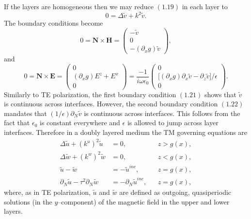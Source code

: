 If the layers are homogeneous then we may reduce $(1.19)$ in each layer to 
\begin{equation}
0=\Delta \tilde{v} + k^2\tilde{v}.
\end{equation}
The boundary conditions become
\begin{equation}
0=\textbf{N} \times \textbf{H} = \begin{pmatrix}
-\tilde{v} \\ 0 \\ -(\partial_x g)\tilde{v}
\end{pmatrix},
\end{equation}
and
\begin{equation}
0=\textbf{N} \times \textbf{E} = \begin{pmatrix}
0 \\ (\partial_x g)E^z + E^x \\ 0 
\end{pmatrix}=\frac{-1}{i\omega\epsilon_0}\begin{pmatrix}
0 \\ \big[(\partial_x g)\partial_x \tilde{v} - \partial_z \tilde{v}\big]/\epsilon \\ 0
\end{pmatrix}.
\end{equation}
Similarly to TE polarization, the first boundary condition $(1.21)$ shows that $\tilde{v}$ is continuous across interfaces. However, the second boundary condition $(1.22)$ mandates that $(1/\epsilon)\partial_N \tilde{v}$ is continuous across interfaces. This follows from the fact that $\epsilon_0$ is constant everywhere and $\epsilon$ is allowed to jump across layer interfaces. Therefore in a doubly layered medium the TM governing equations are
\begin{subequations}
\begin{align}
\Delta \tilde{u} + (k^u)^2 \tilde{u} &=0,&& z > g(x),\\
\Delta \tilde{w} + (k^w)^2 \tilde{w} &=0,&& z < g(x),\\
\tilde{u}-\tilde{w} &= -\tilde{u}^{inc},&& z=g(x),\\
\partial_N \tilde{u}-\tau^2\partial_N \tilde{w} &= -\partial_N \tilde{u}^{inc},&& z=g(x),
\end{align}
\end{subequations}
where, as in TE polarization, $\tilde{u}$ and $\tilde{w}$ are defined as outgoing, quasiperiodic solutions (in the $y$--component) of the magnetic field in the upper and lower layers. 

